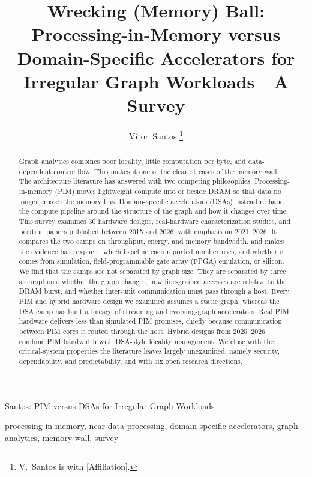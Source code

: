 \documentclass[journal,onecolumn]{IEEEtran}
\begin{document}
\title{Wrecking (Memory) Ball: Processing-in-Memory versus Domain-Specific Accelerators for Irregular Graph Workloads---A Survey}

\author{Vítor~Santos%
\thanks{V.~Santos is with [Affiliation].}}

%
{Santos: PIM versus DSAs for Irregular Graph Workloads}

\maketitle

\begin{abstract}
Graph analytics combines poor locality, little computation per byte, and data-dependent control flow. This makes it one of the clearest cases of the memory wall. The architecture literature has answered with two competing philosophies. Processing-in-memory (PIM) moves lightweight compute into or beside DRAM so that data no longer crosses the memory bus. Domain-specific accelerators (DSAs) instead reshape the compute pipeline around the structure of the graph and how it changes over time. This survey examines 30 hardware designs, real-hardware characterization studies, and position papers published between 2015 and 2026, with emphasis on 2021--2026. It compares the two camps on throughput, energy, and memory bandwidth, and makes the evidence base explicit: which baseline each reported number uses, and whether it comes from simulation, field-programmable gate array (FPGA) emulation, or silicon. We find that the camps are not separated by graph size. They are separated by three assumptions: whether the graph changes, how fine-grained accesses are relative to the DRAM burst, and whether inter-unit communication must pass through a host. Every PIM and hybrid hardware design we examined assumes a static graph, whereas the DSA camp has built a lineage of streaming and evolving-graph accelerators. Real PIM hardware delivers less than simulated PIM promises, chiefly because communication between PIM cores is routed through the host. Hybrid designs from 2025--2026 combine PIM bandwidth with DSA-style locality management. We close with the critical-system properties the literature leaves largely unexamined, namely security, dependability, and predictability, and with six open research directions.
\end{abstract}

\begin{IEEEkeywords}
processing-in-memory, near-data processing, domain-specific accelerators, graph analytics, memory wall, survey
\end{IEEEkeywords}
\end{document}

